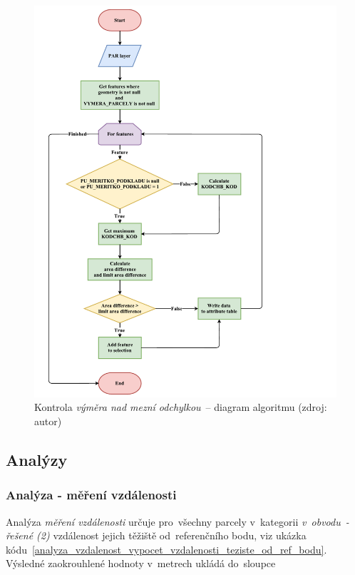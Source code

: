 	\begin{figure}[H] \centering
		\includegraphics[width=1.2\textwidth]{./pictures/vymera.pdf}
		\caption[Kontrola \textit{výměra nad mezní
odchylkou}~– diagram algoritmu]{Kontrola \textit{výměra nad mezní
odchylkou}~– diagram algoritmu (zdroj: autor)}
		\label{fig:diagram_vymera}
 	\end{figure}

\subsection{Analýzy}
\label{analyzy}

\subsubsection{Analýza - měření vzdálenosti}
\label{analyza_vzdalenosti}

Analýza \textit{měření vzdálenosti} určuje pro~všechny parcely
v~kategorii \textit{v~obvodu~- řešené (2)} vzdálenost jejich těžiště
od~referenčního bodu, viz ukázka
kódu~\ref{analyza_vzdalenost_vypocet_vzdalenosti_teziste_od_ref_bodu}. Výsledné
zaokrouhlené hodnoty v~metrech ukládá do~sloupce
\texttt{}

